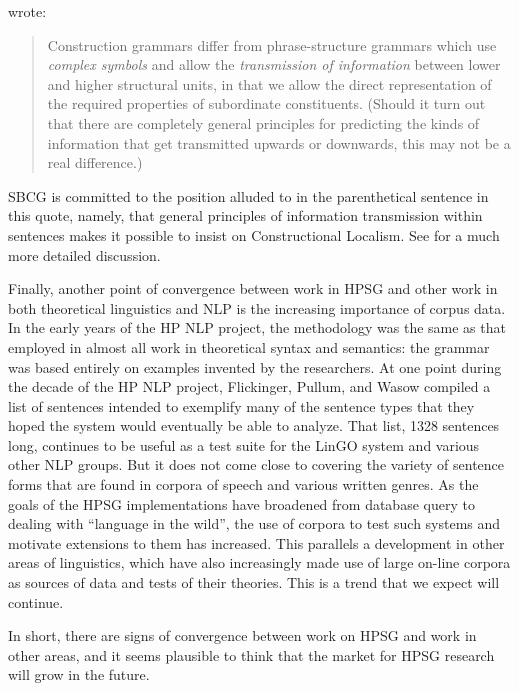 \documentclass[output=paper]{langsci/langscibook}
\begin{document}
\citet[]{Fillmore88a} wrote:
\begin{quote}
Construction grammars differ from phrase-structure grammars which use \emph{complex symbols} and
allow the \emph{transmission of information} between lower and higher structural units, in that we
allow the direct representation of the required properties of subordinate constituents.  (Should it
turn out that there are completely general principles for predicting the kinds of information that
get transmitted upwards or downwards, this may not be a real difference.) \citep[]{Fillmore88a}
\end{quote}
SBCG is committed to the position alluded to in the parenthetical sentence in this quote, namely, that general principles of information transmission within sentences makes it possible to insist on Constructional Localism.   See  for a much more detailed discussion.  

Finally, another point of convergence between work in HPSG and other work in both theoretical linguistics and NLP is the increasing importance of corpus data. In the early years of the HP NLP project, the methodology was the same as that employed in almost all work in theoretical syntax and semantics:  the grammar was based entirely on examples invented by the researchers.  At one point during the decade of the HP NLP project, Flickinger, Pullum, and Wasow compiled a list of sentences intended to exemplify many of the sentence types that they hoped the system would eventually be able to analyze.  That list, 1328 sentences long, continues to be useful as a test suite for the LinGO system and various other NLP groups.  But it does not come close to covering the variety of sentence forms that are found in corpora of speech and various written genres.  As the goals of the HPSG implementations have broadened from database query to dealing with ``language in the wild'', the use of corpora to test such systems and motivate extensions to them has increased.  This parallels a development in other areas of linguistics, which have also increasingly made use of large on-line corpora as sources of data and tests of
their theories.  This is a trend that we expect will continue.
 
In short, there are signs of convergence between work on HPSG and work in other areas, and it seems plausible to think that the market for HPSG research will grow in the future.


{\sloppy
\printbibliography[heading=subbibliography,notkeyword=this]
}
\end{document}
